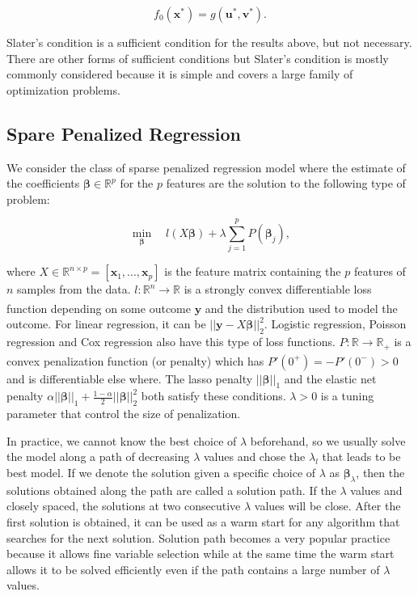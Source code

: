 \begin{equation}
    f_0(\boldsymbol x^*)=g(\boldsymbol u^*,\boldsymbol v^*).
\end{equation}

Slater's condition is a sufficient condition for the results above, but not necessary. There are other forms of sufficient conditions but Slater's condition is mostly commonly considered because it is simple and covers a large family of optimization problems. 

\subsection{Spare Penalized Regression}

We consider the class of sparse penalized regression model where the estimate of the coefficients $\boldsymbol\beta\in\mathbb{R}^p$ for the $p$ features are the solution to the following type of problem:

\begin{equation}
    \label{eq:spr}
    \underset{\boldsymbol\beta}{\min}\quad l(X\boldsymbol\beta)+\lambda \sum_{j=1}^pP(\boldsymbol\beta_j),
\end{equation}

where $X\in\mathbb{R}^{n\times p}=[\boldsymbol x_1,...,\boldsymbol x_p]$ is the feature matrix containing the $p$ features of $n$ samples from the data. $l:\mathbb{R}^n\xrightarrow[]{}\mathbb{R}$ is a strongly convex differentiable loss function depending on some outcome $\boldsymbol y$ and the distribution used to model the outcome. For linear regression, it can be $||\boldsymbol y-X\boldsymbol\beta||_2^2$. Logistic regression, Poisson regression and Cox regression also have this type of loss functions.  $P:\mathbb{R}\xrightarrow[]{}\mathbb{R}_+$ is a convex penalization function (or penalty) which has $P'(0^+)=-P'(0^-)>0$ and is differentiable else where. The lasso penalty $||\boldsymbol\beta||_1$ and the elastic net penalty $\alpha||\boldsymbol\beta||_1+\frac{1-\alpha}{2}||\boldsymbol\beta||_2^2$ both satisfy these conditions. $\lambda>0$ is a tuning parameter that control the size of penalization. 

In practice, we cannot know the best choice of $\lambda$ beforehand, so we usually solve the model along a path of decreasing $\lambda$ values and chose the $\lambda_l$ that leads to be best model. If we denote the solution given a specific choice of $\lambda$ as $\boldsymbol\beta_\lambda$, then the solutions obtained along the path are called a solution path. If the $\lambda$ values and closely spaced, the solutions at two consecutive $\lambda$ values will be close. After the first solution is obtained, it can be used as a warm start for any algorithm that searches for the next solution. Solution path becomes a very popular practice because it allows fine variable selection while at the same time the warm start allows it to be solved efficiently even if the path contains a large number of $\lambda$ values. 

